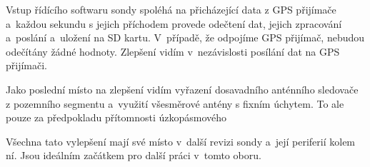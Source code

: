 \documentclass[twoside]{ctuthesis}
\theoremstyle{plain}
\theoremstyle{definition}
\theoremstyle{note}
\begin{document}
	Vstup řídícího softwaru sondy spoléhá na přicházející data z GPS přijímače a~každou sekundu s jejich příchodem provede odečtení dat, jejich zpracování a~poslání a~uložení na SD kartu. V~případě, že odpojíme GPS přijímač, nebudou odečítány žádné hodnoty. Zlepšení vidím v~nezávislosti posílání dat na GPS přijímači.

	Jako poslední místo na zlepšení vidím vyřazení dosavadního anténního sledovače z pozemního segmentu a~využití všesměrové antény s fixním úchytem. To ale pouze za předpokladu přítomnosti úzkopásmového 

	Všechna tato vylepšení mají své místo v~další revizi sondy a~její periferií kolem ní. Jsou ideálním začátkem pro další práci v~tomto oboru.
	
















	


\appendix

\printindex
\end{document}
